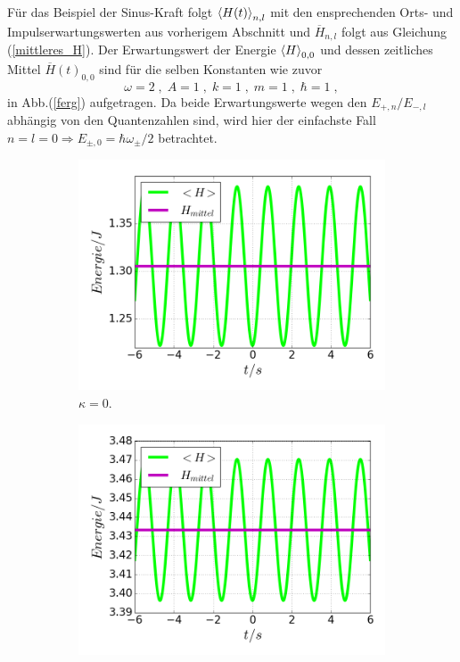     Für das Beispiel der Sinus-Kraft folgt $\braket{H(t)}_{n,l}$ mit den ensprechenden Orts- und Impulserwartungswerten aus vorherigem Abschnitt und  $\overline{H}_{n,l}$ folgt aus Gleichung (\ref{mittleres_H}).
    Der Erwartungswert der Energie $\braket H_{0,0}$ und dessen zeitliches Mittel $\overline{H}(t)_{0,0}$ sind für die selben Konstanten wie zuvor
    \begin{equation}
      \omega=2 \;,\; A=1 \;,\; k=1 \;,\; m=1 \;,\; \hbar=1 \; ,
    \end{equation}
    in Abb.(\ref{ferg}) aufgetragen.
    Da beide Erwartungswerte wegen den $E_{+,n}/E_{-,l}$ abhängig von den Quantenzahlen sind, wird hier der einfachste Fall $n=l=0 \Rightarrow E_{\pm,0}=\hbar \omega_\pm/2$ betrachtet.
\iffalse
    \begin{figure}
      \begin{subfigure}[t]{0.5\textwidth}
        \centering
        \includegraphics[width=\textwidth]{plots/<H>00_kappa0.png}
        \caption{$\kappa=0$.}
        \label{fig:H_kappa0}
      \end{subfigure}
      \quad
      \begin{subfigure}[t]{0.5\textwidth}
          \centering
          \includegraphics[width=\textwidth]{plots/<H>00_kappa15.png}

\end{subfigure}
\end{figure}
